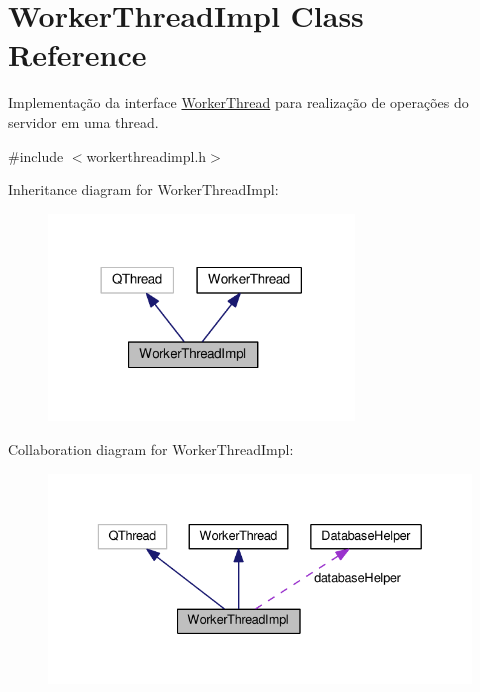 \hypertarget{classWorkerThreadImpl}{}\section{Worker\+Thread\+Impl Class Reference}
\label{classWorkerThreadImpl}


Implementação da interface \hyperlink{classWorkerThread}{Worker\+Thread} para realização de operações do servidor em uma thread.  




{\ttfamily \#include $<$workerthreadimpl.\+h$>$}



Inheritance diagram for Worker\+Thread\+Impl\+:\nopagebreak
\begin{figure}[H]
\begin{center}
\leavevmode
\includegraphics[width=230pt]{d6/d44/classWorkerThreadImpl__inherit__graph}
\end{center}
\end{figure}


Collaboration diagram for Worker\+Thread\+Impl\+:\nopagebreak
\begin{figure}[H]
\begin{center}
\leavevmode
\includegraphics[width=336pt]{de/d29/classWorkerThreadImpl__coll__graph}
\end{center}
\end{figure}
